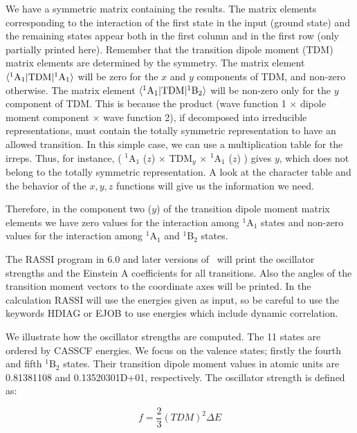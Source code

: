 We have a symmetric matrix containing the results. The matrix elements
corresponding to the interaction of the first state in the input
(ground state) and the remaining states appear both in the first
column and in the first row (only partially printed here). Remember
that the transition dipole moment (TDM) matrix elements are determined by the symmetry.
The matrix element $\langle ^1{\rm A}_1|{\rm TDM}| ^1{\rm A}_1 \rangle$ will be zero for the
$x$ and $y$ components of TDM, and non-zero otherwise.
The matrix element $\langle ^1{\rm A}_1|{\rm TDM}| ^1{\rm B}_2 \rangle$ will be non-zero only 
for the $y$ component of TDM. This is because the product
(wave function 1 $\times$ dipole moment component $\times$ wave function 2), if decomposed into
irreducible representations, must contain the
totally symmetric representation to have an allowed transition. In this simple case,
we can use a multiplication table for the irreps.
Thus, for instance, ( $^1$A$_1$ ($z$) $\times$ TDM$_y$ $\times$ $^1$A$_1$ ($z$) ) gives $y$, which
does not belong to the totally symmetric representation. A look at the
character table and the behavior of the $x,y,z$ functions will give us the
information we need.

Therefore, in the component two ($y$) of the transition dipole moment
matrix elements we have zero values for the interaction among $^1$A$_1$
states and non-zero values for the interaction among $^1$A$_1$ and $^1$B$_2$
states. 

The RASSI program in 6.0 and later versions of \molcas\ will print the
oscillator strengths and the Einstein A coefficients for all transitions. Also
the angles of the transition moment vectors to the coordinate axes will be
printed. In the calculation  RASSI will use the energies given as input, so be
careful to use the keywords HDIAG or EJOB to use energies which include dynamic
correlation.

We illustrate how the oscillator strengths are computed. The 11 states are 
ordered by CASSCF energies. We focus on the valence states; firstly the fourth 
and fifth $^1$B$_2$ states. Their transition dipole moment values in
atomic units are 0.81381108 and 0.13520301D+01, respectively. The oscillator
strength is defined as:


\begin{equation}
\label{eqn:oscillator}
f = \frac{2}{3} (TDM)^2 \Delta E
\end{equation}


